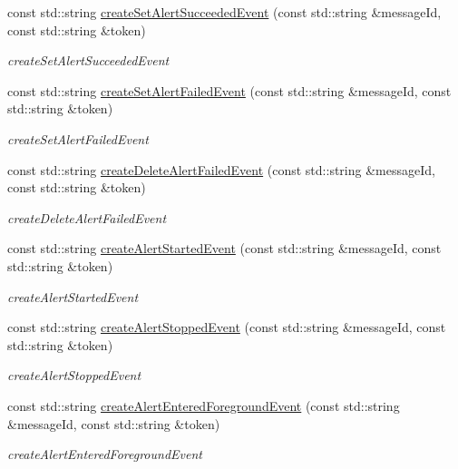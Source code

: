 \begin{DoxyCompactItemize}
const std\+::string \hyperlink{classAVSJson_1_1JsonFactory_a2ec0b23941d61705c3680d6017c1eb27}{create\+Set\+Alert\+Succeeded\+Event} (const std\+::string \&message\+Id, const std\+::string \&token)
\begin{DoxyCompactList}\small\item\em create\+Set\+Alert\+Succeeded\+Event \end{DoxyCompactList}\item 
const std\+::string \hyperlink{classAVSJson_1_1JsonFactory_a12b8a89030081dbfb9df43279c5fa1f0}{create\+Set\+Alert\+Failed\+Event} (const std\+::string \&message\+Id, const std\+::string \&token)
\begin{DoxyCompactList}\small\item\em create\+Set\+Alert\+Failed\+Event \end{DoxyCompactList}\item 
const std\+::string \hyperlink{classAVSJson_1_1JsonFactory_a6c03efa846b5d1cd410405d794ea292f}{create\+Delete\+Alert\+Failed\+Event} (const std\+::string \&message\+Id, const std\+::string \&token)
\begin{DoxyCompactList}\small\item\em create\+Delete\+Alert\+Failed\+Event \end{DoxyCompactList}\item 
const std\+::string \hyperlink{classAVSJson_1_1JsonFactory_af4b4bccd89a168a3ee57e73a346d5554}{create\+Alert\+Started\+Event} (const std\+::string \&message\+Id, const std\+::string \&token)
\begin{DoxyCompactList}\small\item\em create\+Alert\+Started\+Event \end{DoxyCompactList}\item 
const std\+::string \hyperlink{classAVSJson_1_1JsonFactory_a86e0cf9125314d467eda43686b5916f6}{create\+Alert\+Stopped\+Event} (const std\+::string \&message\+Id, const std\+::string \&token)
\begin{DoxyCompactList}\small\item\em create\+Alert\+Stopped\+Event \end{DoxyCompactList}\item 
const std\+::string \hyperlink{classAVSJson_1_1JsonFactory_afa1846a4bb4a30124c9bf9852c5618d7}{create\+Alert\+Entered\+Foreground\+Event} (const std\+::string \&message\+Id, const std\+::string \&token)
\begin{DoxyCompactList}\small\item\em create\+Alert\+Entered\+Foreground\+Event \end{DoxyCompactList}\item 

\end{DoxyCompactItemize}
